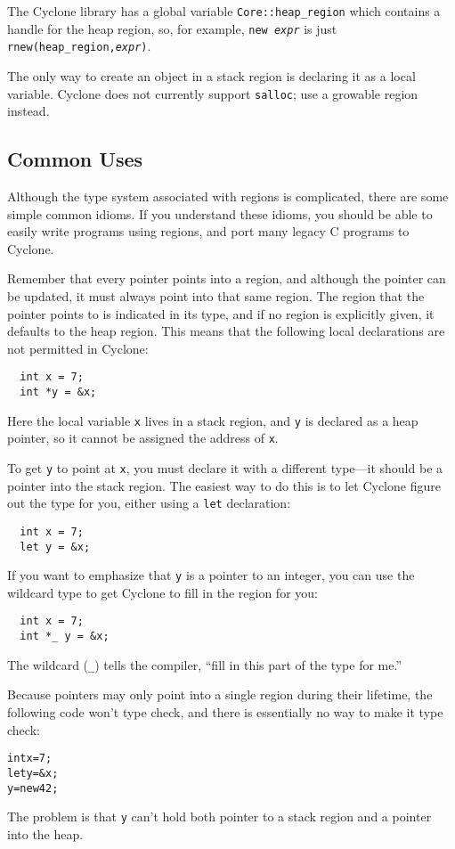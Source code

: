 The Cyclone library has a global variable \texttt{Core::heap_region}
which contains a handle for the heap region, so, for example,
\texttt{new {\it expr}} is just \texttt{rnew(heap_region,{\it expr})}.

The only way to create an object in a stack region is declaring it as
a local variable.  Cyclone does not currently support \texttt{salloc};
use a growable region instead.

\subsection{Common Uses}

Although the type system associated with regions is complicated, there
are some simple common idioms.  If you understand these idioms, you
should be able to easily write programs using regions, and port many
legacy C programs to Cyclone.

Remember that every pointer points into a region, and although the
pointer can be updated, it must always point into that same region.
The region that the pointer points to is indicated in its type, and if
no region is explicitly given, it defaults to the heap region.
This means that the following local declarations are not permitted in
Cyclone:
\begin{verbatim}
  int x = 7;
  int *y = &x;
\end{verbatim}
Here the local variable \texttt{x} lives in a stack region, and
\texttt{y} is declared as a heap pointer, so it cannot be assigned the
address of \texttt{x}.

To get \texttt{y} to point at \texttt{x}, you must declare it with a
different type---it should be a pointer into the stack region.  The
easiest way to do this is to let Cyclone figure out the type for you,
either using a \texttt{let} declaration:
\begin{verbatim}
  int x = 7;
  let y = &x;
\end{verbatim}
If you want to emphasize that \texttt{y} is a pointer to an integer,
you can use the wildcard type to get Cyclone to fill in the region for
you: 
\begin{verbatim}
  int x = 7;
  int *_ y = &x;
\end{verbatim}
The wildcard (\texttt{_}) tells the compiler, ``fill in this part of
the type for me.''

Because pointers may only point into a single region during their
lifetime, the following code won't type check, and there is
essentially no way to make it type check:
\begin{alltt}
  int x = 7;
  let y = &x;
  y = new 42;
\end{alltt}
The problem is that \texttt{y} can't hold both pointer to a stack
region and a pointer into the heap.

